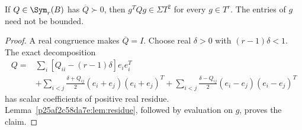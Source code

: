 \begin{lemma}\label{p25af2c58da7e:lem:gram}
If $Q\in\Sym_r(B)$ has $\overline Q\succ0$, then $g^TQg\in\Sigma T^2$ for every $g\in T^r$. The entries of $g$ need not be bounded.
\end{lemma}
\begin{proof}
A real congruence makes $\overline Q=I$. Choose real $\delta>0$ with $(r-1)\delta<1$. The exact decomposition
\begin{align*}
Q={}&\sum_i[Q_{ii}-(r-1)\delta]e_ie_i^T\\
 &+\sum_{i<j}\frac{\delta+Q_{ij}}2(e_i+e_j)(e_i+e_j)^T
 +\sum_{i<j}\frac{\delta-Q_{ij}}2(e_i-e_j)(e_i-e_j)^T
\end{align*}
has scalar coefficients of positive real residue. Lemma~\ref{p25af2c58da7e:lem:residue}, followed by evaluation on $g$, proves the claim.
\end{proof}
